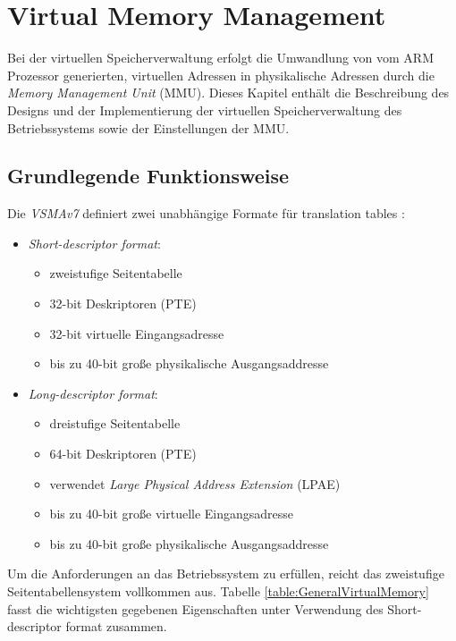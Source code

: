 \section{Virtual Memory Management}

Bei der virtuellen Speicherverwaltung erfolgt die Umwandlung von vom ARM Prozessor generierten, virtuellen Adressen in physikalische Adressen durch die \emph{Memory Management Unit} (MMU). Dieses Kapitel enthält die Beschreibung des Designs und der Implementierung der virtuellen Speicherverwaltung des Betriebssystems sowie der Einstellungen der MMU.\\

\subsection{Grundlegende Funktionsweise}

Die \emph{VSMAv7} definiert zwei unabhängige Formate für translation tables \cite[S. B3-1318]{ARM:ARM}:

\begin{itemize}
	\item \emph{Short-descriptor format}:
	\begin{itemize}
		\item zweistufige Seitentabelle 
		\item 32-bit Deskriptoren (PTE)
		\item 32-bit virtuelle Eingangsadresse 
		\item bis zu 40-bit große physikalische Ausgangsaddresse
	\end{itemize}
	\item \emph{Long-descriptor format}:
	\begin{itemize}
		\item dreistufige Seitentabelle
		\item 64-bit Deskriptoren (PTE)
		\item verwendet \emph{Large Physical Address Extension} (LPAE)
		\item bis zu 40-bit große virtuelle Eingangsadresse 
		\item bis zu 40-bit große physikalische Ausgangsaddresse
	\end{itemize}
\end{itemize}

Um die Anforderungen an das Betriebssystem zu erfüllen, reicht das zweistufige Seitentabellensystem vollkommen aus. Tabelle \ref{table:GeneralVirtualMemory} fasst die wichtigsten gegebenen Eigenschaften unter Verwendung des Short-descriptor format zusammen.\\

